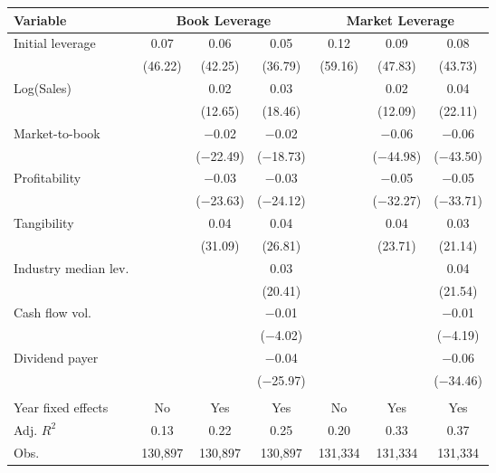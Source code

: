 \begin{tabular}{l*{6}{c}}
\toprule
Variable & \multicolumn{3}{c}{Book Leverage} & \multicolumn{3}{c}{Market Leverage} \\ \midrule
Initial leverage&        0.07&        0.06&        0.05&        0.12&        0.09&        0.08\\
            &     (46.22)&     (42.25)&     (36.79)&     (59.16)&     (47.83)&     (43.73)\\
\addlinespace
Log(Sales)  &            &        0.02&        0.03&            &        0.02&        0.04\\
            &            &     (12.65)&     (18.46)&            &     (12.09)&     (22.11)\\
\addlinespace
Market-to-book&            &     $-$0.02&     $-$0.02&            &     $-$0.06&     $-$0.06\\
            &            &  ($-$22.49)&  ($-$18.73)&            &  ($-$44.98)&  ($-$43.50)\\
\addlinespace
Profitability&            &     $-$0.03&     $-$0.03&            &     $-$0.05&     $-$0.05\\
            &            &  ($-$23.63)&  ($-$24.12)&            &  ($-$32.27)&  ($-$33.71)\\
\addlinespace
Tangibility &            &        0.04&        0.04&            &        0.04&        0.03\\
            &            &     (31.09)&     (26.81)&            &     (23.71)&     (21.14)\\
\addlinespace
Industry median lev.&            &            &        0.03&            &            &        0.04\\
            &            &            &     (20.41)&            &            &     (21.54)\\
\addlinespace
Cash flow vol.&            &            &     $-$0.01&            &            &     $-$0.01\\
            &            &            &   ($-$4.02)&            &            &   ($-$4.19)\\
\addlinespace
Dividend payer&            &            &     $-$0.04&            &            &     $-$0.06\\
            &            &            &  ($-$25.97)&            &            &  ($-$34.46)\\
\\
Year fixed effects&          No&         Yes&         Yes&          No&         Yes&         Yes\\
Adj. $ R^2$ &        0.13&        0.22&        0.25&        0.20&        0.33&        0.37\\
Obs.        &     130,897&     130,897&     130,897&     131,334&     131,334&     131,334\\
\bottomrule
\end{tabular}
